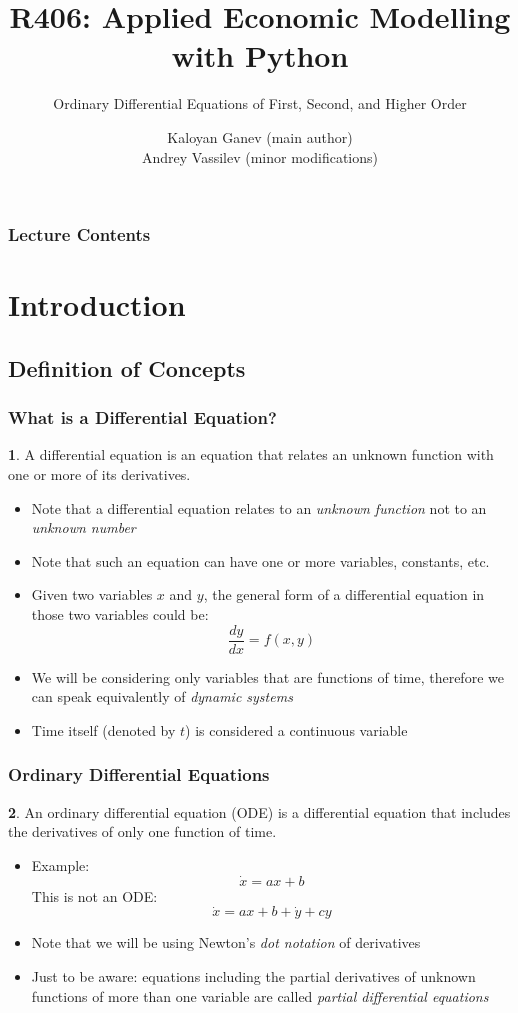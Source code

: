 \documentclass[10pt,usenames,dvipsnames]{beamer}
\title{R406: Applied Economic Modelling with Python}
\subtitle{\textcolor{myred}{Ordinary Differential Equations of First, Second, and Higher Order}}
\author[Kaloyan Ganev,  Andrey Vassilev]{Kaloyan Ganev (main author) \\
	Andrey Vassilev (minor modifications)}
\date{}
\theoremstyle{definition}
\newtheorem{definition}{\translate{Definition}}
\begin{document}
\maketitle

\begin{frame}[fragile]
\frametitle{Lecture Contents}
\tableofcontents
\end{frame}

\section{Introduction}
\subsection{Definition of Concepts}
\begin{frame}[fragile]
\frametitle{What is a Differential Equation?}
\begin{definition}
	A differential equation is an equation that relates an unknown function with one or more of its derivatives.
\end{definition}
\begin{itemize}
	\item Note that a differential equation relates to an \textit{unknown function} not to an \textit{unknown number}
	\item Note that such an equation can have one or more variables, constants, etc.
	\item Given two variables $x$ and $y$, the general form of a differential equation in those two variables could be:
	\[
		\dfrac{dy}{dx} = f(x,y)
	\]
	\item We will be considering only variables that are functions of time, therefore we can speak equivalently of \textit{dynamic systems}
	\item Time itself (denoted by $t$) is considered a continuous variable
\end{itemize}
\end{frame}

\begin{frame}[fragile]
\frametitle{Ordinary Differential Equations}
\begin{definition}
	An ordinary differential equation (ODE) is a differential equation that includes the derivatives of only one function of time.
\end{definition}
\begin{itemize}
	\item Example:
	\[
		\dot{x} = ax + b
	\]
	This is not an ODE:
	\[
		\dot{x} = ax + b + \dot{y} + cy
	\]
	\item Note that we will be using Newton's \textit{dot notation} of derivatives
	\item Just to be aware: equations including the partial derivatives of unknown functions of more than one variable are called \textit{partial differential equations}
\end{itemize}
\end{frame}
\end{document}
